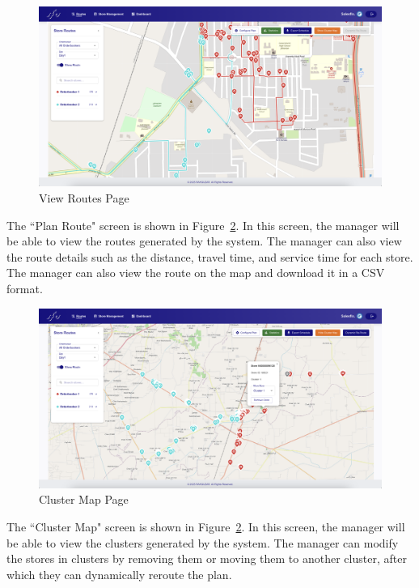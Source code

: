 \begin{figure}[H]
    \centering
    \includegraphics[width=1\textwidth]{images/plan.png} %
    \caption{View Routes Page}
    \label{fig:image6}
\end{figure}
The ``Plan Route" screen is shown in Figure~\ref{fig:image6}. In this screen, the manager will be able to view the routes generated by the system. The manager can also view the route details such as the distance, travel time, and service time for each store. The manager can also view the route on the map and download it in a CSV format.

\begin{figure}[H]
    \centering
    \includegraphics[width=1\textwidth]{images/Cluster map.png} %
    \caption{Cluster Map Page}
    \label{fig:image6}
\end{figure}
The ``Cluster Map" screen is shown in Figure~\ref{fig:image6}. In this screen, the manager will be able to view the clusters generated by the system. The manager can modify the stores in clusters by removing them or moving them to another cluster, after which they can dynamically reroute the plan.

